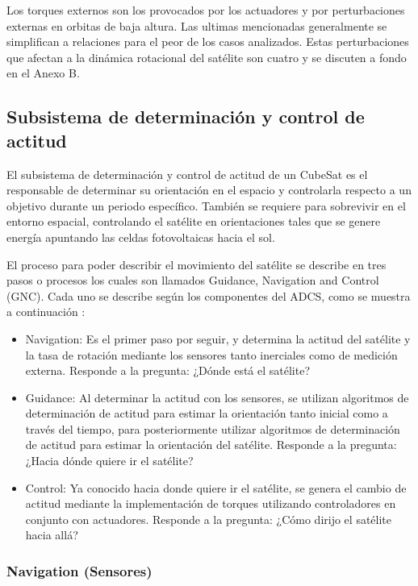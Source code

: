 Los torques externos son los provocados por los actuadores y por perturbaciones externas en orbitas de baja altura. Las ultimas mencionadas generalmente se simplifican a relaciones para el peor de los casos analizados. Estas perturbaciones que afectan a la dinámica rotacional del satélite son cuatro y se discuten a fondo en el Anexo B.

\subsection{Subsistema de determinación y control de actitud}

El subsistema de determinación y control de actitud de un CubeSat es el responsable de determinar su orientación en el espacio y controlarla respecto a un objetivo durante un periodo específico. También se requiere para sobrevivir en el entorno espacial, controlando el satélite en orientaciones tales que se genere energía apuntando las celdas fotovoltaicas hacia el sol.

El proceso para poder describir el movimiento del satélite se describe en tres pasos o procesos los cuales son llamados Guidance, Navigation and Control (GNC). Cada uno se describe según los componentes del ADCS, como se muestra a continuación \cite{ref28}:

\begin{itemize}
	\item Navigation: Es el primer paso por seguir, y determina la actitud del satélite y la tasa de rotación mediante los sensores tanto inerciales como de medición externa. Responde a la pregunta: ¿Dónde está el satélite?
	\item Guidance: Al determinar la actitud con los sensores, se utilizan algoritmos de determinación de actitud para estimar la orientación tanto inicial como a través del tiempo, para posteriormente utilizar algoritmos de determinación de actitud para estimar la orientación del satélite. Responde a la pregunta: ¿Hacia dónde quiere ir el satélite?
	\item Control: Ya conocido hacia donde quiere ir el satélite, se genera el cambio de actitud mediante la implementación de torques utilizando controladores en conjunto con actuadores. Responde a la pregunta: ¿Cómo dirijo el satélite hacia allá?
\end{itemize}

\subsubsection{Navigation (Sensores)}

